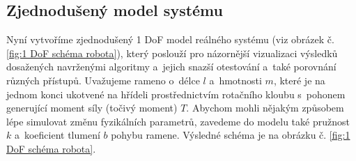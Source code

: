 \subsection{Zjednodušený model systému}
Nyní vytvoříme zjednodušený 1 DoF model reálného systému (viz obrázek č. \ref{fig:1 DoF schéma robota}), který poslouží pro názornější vizualizaci výsledků dosažených navrženými algoritmy a~jejich snazší otestování a~také porovnání různých přístupů.
Uvažujeme rameno o~délce $l$ a~hmotnosti $m$, které je na jednom konci
ukotvené na hřídeli prostřednictvím rotačního kloubu s~pohonem generující moment síly (točivý moment) $T$. Abychom mohli
nějakým způsobem lépe simulovat změnu fyzikálních parametrů, zavedeme do modelu
také pružnost $k$ a~koeficient tlumení $b$ pohybu ramene. Výsledné schéma je na
obrázku č. \ref{fig:1 DoF schéma robota}.

